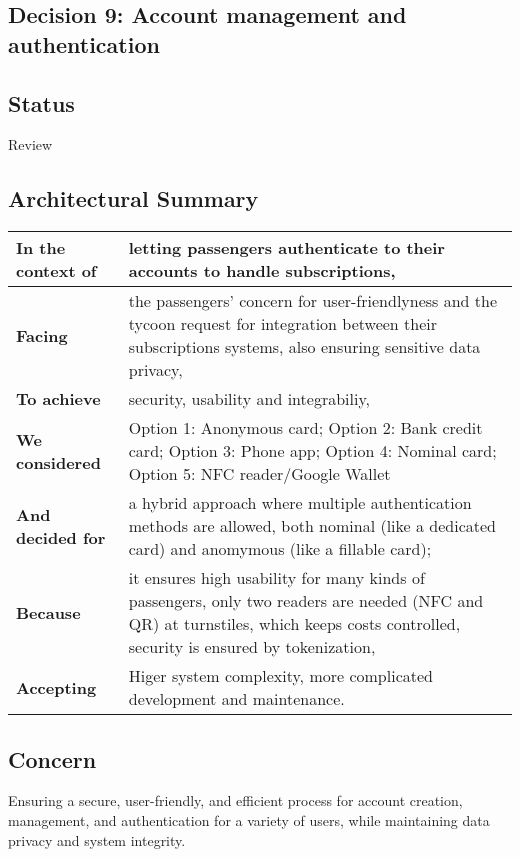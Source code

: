 \subsection{Decision 9: Account management and authentication}

\subsection*{Status}
Review

\subsection*{Architectural Summary}
\begin{tabular}{|p{3.5cm}|p{10.5cm}|}
    \hline
    \textbf{In the context of} & letting passengers authenticate to their accounts to handle subscriptions, \\
    \hline
    \textbf{Facing} & the passengers' concern for user-friendlyness and the tycoon request for integration between their subscriptions systems, also ensuring sensitive data privacy, \\
    \hline
    \textbf{To achieve} & security, usability and integrabiliy, \\
    \hline
    \textbf{We considered} & Option 1: Anonymous card; Option 2: Bank credit card; Option 3: Phone app; Option 4: Nominal card; Option 5: NFC reader/Google Wallet\\
    \hline
    \textbf{And decided for} & a hybrid approach where multiple authentication methods are allowed, both nominal (like a dedicated card) and anomymous (like a fillable card);\\
    \hline
    \textbf{Because} & it ensures high usability for many kinds of passengers, only two readers are needed (NFC and QR) at turnstiles, which keeps costs controlled, security is ensured by tokenization, \\
    \hline
    \textbf{Accepting} & Higer system complexity, more complicated development and maintenance. \\
    \hline
\end{tabular}

\subsection*{Concern}
Ensuring a secure, user-friendly, and efficient process for account creation, management, and authentication for a variety of users, while maintaining data privacy and system integrity.

